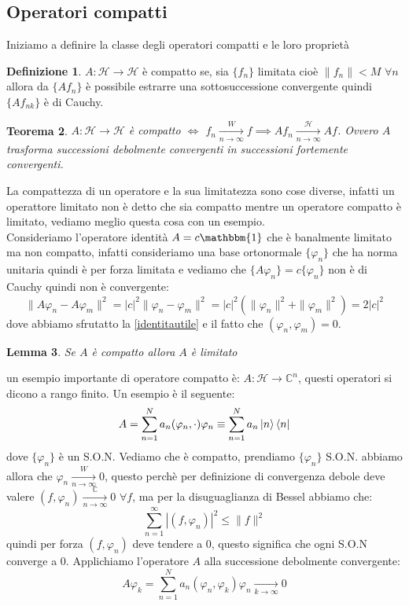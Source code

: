 \documentclass[12pt]{book}
\theoremstyle{plain}
\newcommand{\C}{\mathbb{C}}
\renewcommand{\H}{\mathcal{H}}
\newtheorem{thm}{Teorema}[section]
\newtheorem{lem}[thm]{Lemma}
\theoremstyle{definition}
\newtheorem{dfn}[thm]{Definizione}
\theoremstyle{remark}
\begin{document}
\subsection{Operatori compatti}
Iniziamo a definire la classe degli operatori compatti e le loro proprietà
\begin{dfn}
$A:\H\to\H$ è compatto se, sia $\{f_n\}$ limitata cioè $\|f_n\|<M$ $\forall n$ allora da $\{Af_n\}$ è possibile estrarre una sottosuccessione convergente quindi $\{Af_{nk}\}$ è di Cauchy.
\end{dfn}
\begin{thm}
\label{compatto}
$A:\H\to\H$ è compatto $\iff$ $f_n\xrightarrow[n\to \infty]{W} f \implies Af_n \xrightarrow[n\to \infty]{\H}Af$. Ovvero $A$ trasforma successioni debolmente convergenti in successioni fortemente convergenti.
\end{thm}
La compattezza di un operatore e la sua limitatezza sono cose diverse, infatti un operattore limitato non è detto che sia compatto mentre un operatore compatto è limitato, vediamo meglio questa cosa con un esempio.\\
Consideriamo l'operatore identità $A = c\mathbbm{1}$ che è banalmente limitato ma non compatto, infatti consideriamo una base ortonormale $\{\varphi_n\}$ che ha norma unitaria quindi è per forza limitata e vediamo che $\{A\varphi_n\} = c\{\varphi_n\}$ non è di Cauchy quindi non è convergente:
\[\|A\varphi_n-A\varphi_m\|^2 = |c|^2\|\varphi_n-\varphi_m\|^2 = |c|^2 (\|\varphi_n\|^2+\|\varphi_m\|^2) = 2|c|^2 \]
dove abbiamo sfrutatto la \eqref{identitautile} e il fatto che $(\varphi_n,\varphi_m)=0$.
\begin{lem}
Se $A$ è compatto allora $A$ è limitato
\end{lem}
un esempio importante di operatore compatto è: $A:\H\to \C^n$, questi operatori si dicono a rango finito. Un esempio è il seguente:
\[A = \sum_{n=1}^Na_n(\varphi_n,\cdot)\varphi_n \equiv \sum_{n=1}^Na_n\ket{n}\bra{n}\]
dove $\{\varphi_n\}$ è un S.O.N. Vediamo che è compatto, prendiamo $\{\varphi_n\}$ S.O.N. abbiamo allora che $\varphi_n\xrightarrow[n\to \infty]{W} 0$, questo perchè per definizione di convergenza debole deve valere $(f,\varphi_n)\xrightarrow[n\to \infty]{\C} 0$ $\forall f$, ma per la disuguaglianza di Bessel abbiamo che:
\[\sum_{n=1}^\infty |(f,\varphi_n)|^2\leq \|f\|^2\]
quindi per forza $(f,\varphi_n)$ deve tendere a 0, questo significa che ogni S.O.N converge a 0. Applichiamo l'operatore $A$ alla successione debolmente convergente:
\[A\varphi_k = \sum_{n=1}^N a_n (\varphi_n,\varphi_k)\varphi_n \xrightarrow[k\to \infty]{} 0\]
\end{document}
